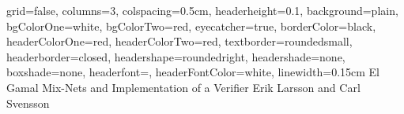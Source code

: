 \documentclass[a0paper,landscape,margin=30pt,movebody=50pt]{baposter}
\begin{document}
\begin{poster}{
grid=false,
columns=3,
colspacing=0.5cm,
headerheight=0.1\textheight,
background=plain,
bgColorOne=white,
bgColorTwo=red,
eyecatcher=true,
borderColor=black,
headerColorOne=red,
headerColorTwo=red,
textborder=roundedsmall,
headerborder=closed,
headershape=roundedright,
headershade=none,
boxshade=none,
headerfont=\sc,
headerFontColor=white,
linewidth=0.15cm
}
{}
{El Gamal Mix-Nets and Implementation of a Verifier}
{Erik Larsson and Carl Svensson}
{}



\end{poster}
\end{document}
